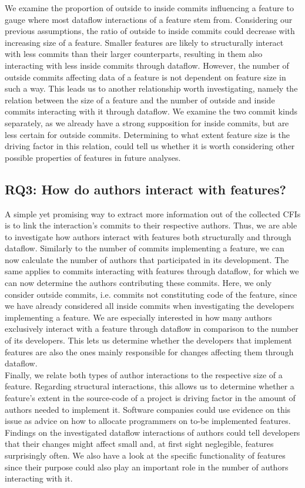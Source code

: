 We examine the proportion of outside to inside commits influencing a feature to gauge where most dataflow interactions of a feature stem from.
Considering our previous assumptions, the ratio of outside to inside commits could decrease with increasing size of a feature.
Smaller features are likely to structurally interact with less commits than their larger counterparts, resulting in them also interacting with less inside commits through dataflow.
However, the number of outside commits affecting data of a feature is not dependent on feature size in such a way.
This leads us to another relationship worth investigating, namely the relation between the size of a feature and the number of outside and inside commits interacting with it through dataflow.
We examine the two commit kinds separately, as we already have a strong supposition for inside commits, but are less certain for outside commits. 
Determining to what extent feature size is the driving factor in this relation, could tell us whether it is worth considering other possible properties of features in future analyses.

\subsection*{\textbf{RQ3: How do authors interact with features?}}

A simple yet promising way to extract more information out of the collected CFIs is to link the interaction's commits to their respective authors.
Thus, we are able to investigate how authors interact with features both structurally and through dataflow.
Similarly to the number of commits implementing a feature, we can now calculate the number of authors that participated in its development.
The same applies to commits interacting with features through dataflow, for which we can now determine the authors contributing these commits.
Here, we only consider outside commits, i.e. commits not constituting code of the feature, since we have already considered all inside commits when investigating the developers implementing a feature.
We are especially interested in how many authors exclusively interact with a feature through dataflow in comparison to the number of its developers.
This lets us determine whether the developers that implement features are also the ones mainly responsible for changes affecting them through dataflow. \\
Finally, we relate both types of author interactions to the respective size of a feature.
Regarding structural interactions, this allows us to determine whether a feature's extent in the source-code of a project is driving factor in the amount of authors needed to implement it. 
Software companies could use evidence on this issue as advice on how to allocate programmers on to-be implemented features.
Findings on the investigated dataflow interactions of authors could tell developers that their changes might affect small and, at first sight neglegible, features surprisingly often.
We also have a look at the specific functionality of features since their purpose could also play an important role in the number of authors interacting with it.

